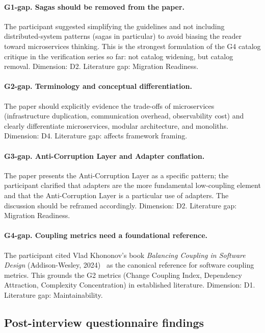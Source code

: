 \paragraph*{G1-gap. Sagas should be removed from the paper.} The participant suggested simplifying the guidelines and not including distributed-system patterns (sagas in particular) to avoid biasing the reader toward microservices thinking. This is the strongest formulation of the G4 catalog critique in the verification series so far: not catalog widening, but catalog removal. Dimension: D2. Literature gap: Migration Readiness.

\paragraph*{G2-gap. Terminology and conceptual differentiation.} The paper should explicitly evidence the trade-offs of microservices (infrastructure duplication, communication overhead, observability cost) and clearly differentiate microservices, modular architecture, and monoliths. Dimension: D4. Literature gap: affects framework framing.

\paragraph*{G3-gap. Anti-Corruption Layer and Adapter conflation.} The paper presents the Anti-Corruption Layer as a specific pattern; the participant clarified that adapters are the more fundamental low-coupling element and that the Anti-Corruption Layer is a particular use of adapters. The discussion should be reframed accordingly. Dimension: D2. Literature gap: Migration Readiness.

\paragraph*{G4-gap. Coupling metrics need a foundational reference.} The participant cited Vlad Khononov's book \emph{Balancing Coupling in Software Design} (Addison-Wesley, 2024)~\cite{khononov2024balancing} as the canonical reference for software coupling metrics. This grounds the G2 metrics (Change Coupling Index, Dependency Attraction, Complexity Concentration) in established literature. Dimension: D1. Literature gap: Maintainability.

\subsection*{Post-interview questionnaire findings}

